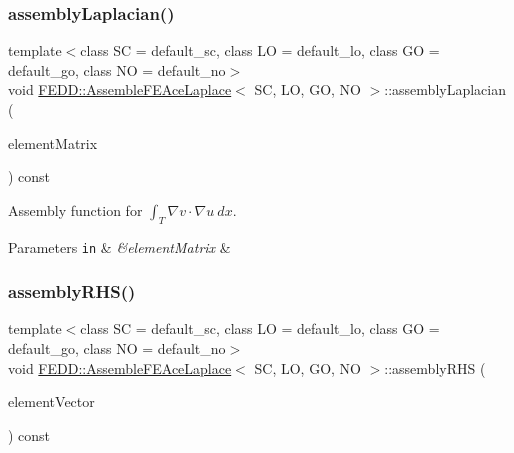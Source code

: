 \subsubsection{\texorpdfstring{assembly\+Laplacian()}{assemblyLaplacian()}}
{\footnotesize\ttfamily template$<$class SC  = default\+\_\+sc, class LO  = default\+\_\+lo, class GO  = default\+\_\+go, class NO  = default\+\_\+no$>$ \\
void \hyperlink{classFEDD_1_1AssembleFEAceLaplace}{F\+E\+D\+D\+::\+Assemble\+F\+E\+Ace\+Laplace}$<$ SC, LO, GO, NO $>$\+::assembly\+Laplacian (\begin{DoxyParamCaption}\item[{Matrix\+Ptr\+\_\+\+Type \&}]{element\+Matrix }\end{DoxyParamCaption}) const\hspace{0.3cm}{\ttfamily [virtual]}}



Assembly function for $ \int_T \nabla v \cdot \nabla u ~dx$. 


\begin{DoxyParams}[1]{Parameters}
\mbox{\tt in}  & {\em \&element\+Matrix} & \\
\hline
\end{DoxyParams}
\mbox{\label{classFEDD_1_1AssembleFEAceLaplace_af3ab42337c36c45446ecfa19bbb51134}} 
\subsubsection{\texorpdfstring{assembly\+R\+H\+S()}{assemblyRHS()}}
{\footnotesize\ttfamily template$<$class SC  = default\+\_\+sc, class LO  = default\+\_\+lo, class GO  = default\+\_\+go, class NO  = default\+\_\+no$>$ \\
void \hyperlink{classFEDD_1_1AssembleFEAceLaplace}{F\+E\+D\+D\+::\+Assemble\+F\+E\+Ace\+Laplace}$<$ SC, LO, GO, NO $>$\+::assembly\+R\+HS (\begin{DoxyParamCaption}\item[{Vector\+Ptr\+\_\+\+Type \&}]{element\+Vector }\end{DoxyParamCaption}) const\hspace{0.3cm}{\ttfamily [virtual]}}



